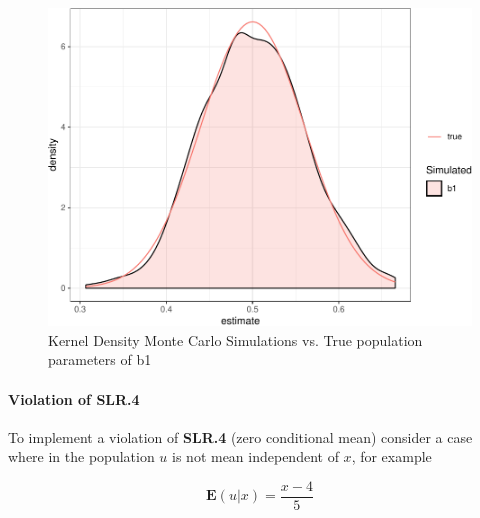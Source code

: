 \documentclass[]{book}
\let\oldparagraph\paragraph
\renewcommand{\paragraph}[1]{\oldparagraph{#1}\mbox{}}
\begin{document}
\begin{figure}

{\centering \includegraphics[width=0.8\linewidth]{MEM5220_R_files/figure-latex/fig9-1} 

}

\caption{Kernel Density Monte Carlo Simulations vs. True population parameters of b1}\label{fig:fig9}
\end{figure}

\hypertarget{violation-of-slr.4}{%
\paragraph{Violation of SLR.4}\label{violation-of-slr.4}}

To implement a violation of \textbf{SLR.4} (zero conditional mean)
consider a case where in the population \(u\) is not mean independent of
\(x\), for example

\[
\mathbf{E}(u|x) = \frac{x-4}{5}
\]
\end{document}
